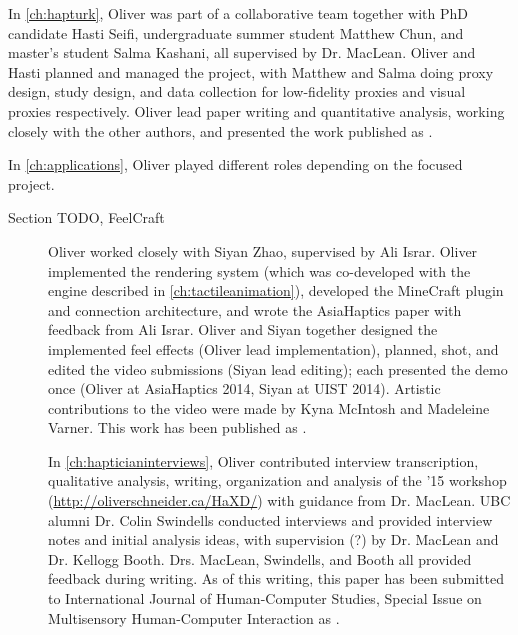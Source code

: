 In \autoref{ch:hapturk}, Oliver was part of a collaborative team together with PhD candidate Hasti Seifi, undergraduate summer student Matthew Chun, and master's student Salma Kashani, all supervised by Dr. MacLean.
Oliver and Hasti planned and managed the project, with Matthew and Salma doing proxy design, study design, and data collection for low-fidelity proxies and visual proxies respectively.
Oliver lead paper writing and quantitative analysis, working closely with the other authors, and presented the work published as \citet{Schneider2016hapturk}.

In \autoref{ch:applications}, Oliver played different roles depending on the focused project.
\begin{description}
\item[Section TODO, FeelCraft] Oliver worked closely with Siyan Zhao, supervised by Ali Israr.
Oliver implemented the rendering system (which was co-developed with the engine described in \autoref{ch:tactileanimation}), developed the MineCraft plugin and connection architecture, and wrote the AsiaHaptics paper with feedback from Ali Israr.
Oliver and Siyan together designed the implemented feel effects (Oliver lead implementation), planned, shot, and edited the video submissions (Siyan lead editing); each presented the demo once (Oliver at AsiaHaptics 2014, Siyan at UIST 2014).
Artistic contributions to the video were made by Kyna McIntosh and Madeleine Varner.
This work has been published as \citet{SchneiderAsiaHaptics2014}.

In \autoref{ch:hapticianinterviews}, Oliver contributed interview transcription, qualitative analysis, writing, organization and analysis of the \haxd '15 workshop (\url{http://oliverschneider.ca/HaXD/}) with guidance from Dr. MacLean.
UBC alumni Dr. Colin Swindells conducted interviews and provided interview notes and initial analysis ideas, with supervision (?) by Dr. MacLean and Dr. Kellogg Booth.
Drs. MacLean, Swindells, and Booth all provided feedback during writing.
As of this writing, this paper has been submitted to International Journal of Human-Computer Studies, Special Issue on Multisensory Human-Computer Interaction as \citet{}.


\end{description}







